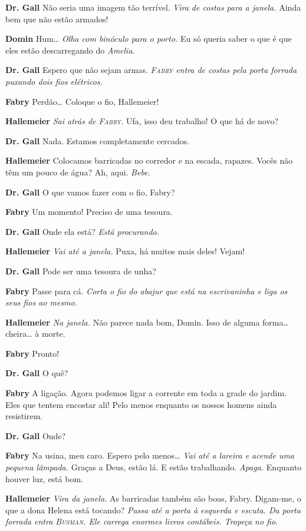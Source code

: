 \textbf{Dr. Gall} Não seria uma imagem tão terrível. \emph{Vira de costas para a
janela.} Ainda bem que não estão armados!

\textbf{Domin} Hum\ldots{} \emph{Olha com binóculo para o porto.} Eu só queria
saber o que é que eles estão descarregando do \textit{Amelia}.

\textbf{Dr. Gall} Espero que não sejam armas.
\emph{\textsc{Fabry} entra de costas pela porta forrada puxando dois fios elétricos.}

\textbf{Fabry} Perdão\ldots{} Coloque o fio, Hallemeier!

\textbf{Hallemeier} \emph{Sai atrás de \textsc{Fabry}.} Ufa, isso deu trabalho! O que há de
novo?

\textbf{Dr. Gall} Nada. Estamos completamente cercados.

\textbf{Hallemeier} Colocamos barricadas no corredor e na escada, rapazes. Vocês não têm
um pouco de água? Ah, aqui. \emph{Bebe.}

\textbf{Dr. Gall} O que vamos fazer com o fio, Fabry?

\textbf{Fabry} Um momento! Preciso de uma tesoura.

\textbf{Dr. Gall} Onde ela está? \emph{Está procurando.}

\textbf{Hallemeier} \emph{Vai até a janela.} Puxa, há muitos mais deles! Vejam!

\textbf{Dr. Gall} Pode ser uma tesoura de unha?

\textbf{Fabry} Passe para cá. \emph{Corta o fio do abajur que está na escrivaninha e liga
os seus fios ao mesmo.}

\textbf{Hallemeier} \emph{Na janela.} Não parece nada bom, Domin. Isso de alguma
forma\ldots{} cheira\ldots{} à morte.

\textbf{Fabry} Pronto!

\textbf{Dr. Gall} O quê?

\textbf{Fabry} A ligação. Agora podemos ligar a corrente em toda a grade do jardim. Eles que tentem
encostar ali! Pelo menos enquanto os nossos homens ainda resistirem.

\textbf{Dr. Gall} Onde?

\textbf{Fabry} Na usina, meu caro. Espero pelo menos\ldots{} \emph{Vai até a
lareira e acende uma pequena lâmpada.} Graças a Deus, estão lá. E estão trabalhando.
\emph{Apaga.} Enquanto houver luz, está bom.

\textbf{Hallemeier} \emph{Vira da janela.} As barricadas também são boas, Fabry.
Digam-me, o que a dona Helena está tocando? \emph{Passa até a porta à esquerda
e escuta. Da porta forrada entra \textsc{Busman}. Ele carrega enormes livros contábeis. Tropeça no fio.}

